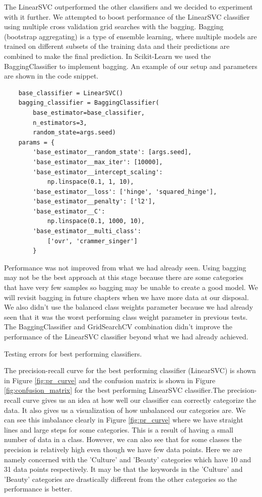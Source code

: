 The LinearSVC outperformed the other classifiers and we decided to experiment with it further. We attempted to boost performance of the LinearSVC classifier using multiple cross validation grid searches with the bagging. Bagging (bootstrap aggregating) is a type of ensemble learning, where multiple models are trained on different subsets of the training data and their predictions are combined to make the final prediction. In Scikit-Learn we used the BaggingClassifier to implement bagging. An example of our setup and parameters are shown in the code snippet. 

\begin{verbatim}
    base_classifier = LinearSVC()
    bagging_classifier = BaggingClassifier(
        base_estimator=base_classifier, 
        n_estimators=3, 
        random_state=args.seed)
    params = {
        'base_estimator__random_state': [args.seed],
        'base_estimator__max_iter': [10000],
        'base_estimator__intercept_scaling': 
            np.linspace(0.1, 1, 10),
        'base_estimator__loss': ['hinge', 'squared_hinge'],
        'base_estimator__penalty': ['l2'],
        'base_estimator__C': 
            np.linspace(0.1, 1000, 10),
        'base_estimator__multi_class': 
            ['ovr', 'crammer_singer']
        }
\end{verbatim}

Performance was not improved from what we had already seen. Using bagging may not be the best approach at this stage because there are some categories that have very few samples so bagging may be unable to create a good model. We will revisit bagging in future chapters when we have more data at our disposal. We also didn't use the balanced class weights parameter because we had already seen that it was the worst performing class weight parameter in previous tests. The BaggingClassifier and GridSearchCV combination didn't improve the performance of the LinearSVC classifier beyond what we had already achieved.

\begin{table}[h]
\centering
\caption{Testing errors for best performing classifiers.}

\label{tab:best_errors}
\end{table}

The precision-recall curve for the best performing classifier (LinearSVC) is shown in Figure \ref{fig:pr_curve} and the confusion matrix is shown in Figure \ref{fig:confusion_matrix} for the best performing LinearSVC classifier.The precision-recall curve gives us an idea at how well our classifier can correctly categorize the data. It also gives us a visualization of how unbalanced our categories are. We can see this imbalance clearly in Figure \ref{fig:pr_curve} where we have straight lines and large steps for some categories. This is a result of having a small number of data in a class. However, we can also see that for some classes the precision is relatively high even though we have few data points. Here we are namely concerned with the 'Culture' and 'Beauty' categories which have 10 and 31 data points respectively. It may be that the keywords in the 'Culture' and 'Beauty' categories are drastically different from the other categories so the performance is better. 

